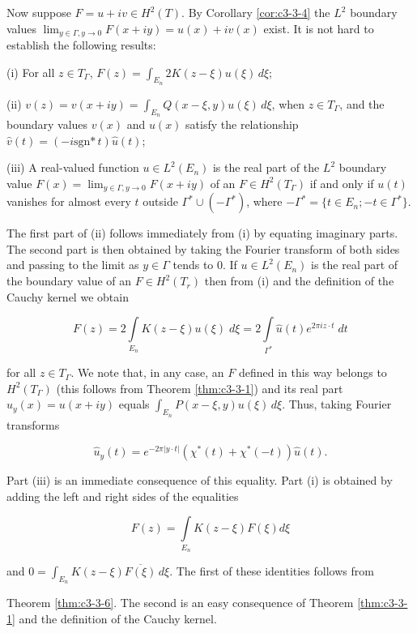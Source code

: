 Now suppose $F = u + iv \in H^2(T)$. By Corollary \ref{cor:c3-3-4} the $L^2$ boundary values $\lim_{y \in \Gamma, y \to 0} F(x + iy) = u(x) + iv(x)$ exist. It is not hard to establish the following results:

(i) For all $z \in T_{\Gamma}$, $F(z) = \int_{E_n} 2K(z - \xi) u(\xi) \, d\xi$;

(ii) $v(z) = v(x + iy) = \int_{E_n} Q(x - \xi, y)u(\xi) \, d\xi$, when $z \in T_\Gamma$, and the boundary values $v(x)$ and $u(x)$ satisfy the relationship $\hat{v}(t) = (-i \text{sgn*}\,t)\hat{u}(t)$;

(iii) A real-valued function $u \in L^2(E_n)$ is the real part of the $L^2$ boundary value $F(x) = \lim_{y \in \Gamma, y \to 0} F(x + iy)$ of an $F \in H^2(T_\Gamma)$ if and only if $u(t)$ vanishes for almost every $t$ outside $\Gamma^* \cup (-\Gamma^*)$, where $-\Gamma^* = \{t \in E_n; -t \in \Gamma^*\}$.

The first part of (ii) follows immediately from (i) by equating imaginary parts. The second part is then obtained by taking the Fourier transform of both sides and passing to the limit as $y \in \Gamma$ tends to 0. If $u \in L^2(E_n)$ is the real part of the boundary value of an $F \in H^2(T_r)$ then from (i) and the definition of the Cauchy kernel we obtain

\[
F(z)=2\int\limits_{E_{n}}K(z-\xi)u(\xi)\;d\xi=2\int\limits_{\Gamma^{*}}\hat{u}(t)e^{2\pi i z\cdot t}\;d t
\]

for all $z \in T_{\Gamma}$. We note that, in any case, an $F$ defined in this way belongs to $H^2(T_{\Gamma})$ (this follows from Theorem \ref{thm:c3-3-1}) and its real part $u_y(x) = u(x + iy)$ equals $\int_{E_n} P(x - \xi, y)u(\xi) \, d\xi$. Thus, taking Fourier transforms

\[
\hat{u}_{y}(t)=e^{-2\pi|y\cdot t|}(\chi^{*}(t)+\chi^{*}(-t))\hat{u}(t).
\]

Part (iii) is an immediate consequence of this equality. Part (i) is obtained by adding the left and right sides of the equalities

\[
F(z)=\int\limits_{E_{n}}K(z-\xi)F(\xi)d\xi
\]

and $0 = \int_{E_n} K(z - \xi) \overline{F(\xi)} \, d\xi$. The first of these identities follows from

Theorem \ref{thm:c3-3-6}. The second is an easy consequence of Theorem \ref{thm:c3-3-1} and the definition of the Cauchy kernel.

